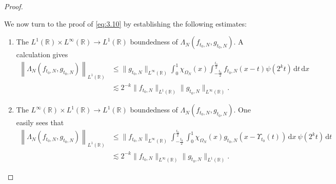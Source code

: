 \documentclass[11pt, twoside, leqno]{article}
\theoremstyle{definition}
\numberwithin{equation}{section}
\begin{document}
\begin{proof}
\begin{enumerate}
\quad We now turn to the proof of \eqref{eq:3.10} by establishing the following estimates:
\begin{enumerate}
  \item[$\circ$] The $L^1(\mathbb{R})\times L^\infty(\mathbb{R}) \rightarrow L^1(\mathbb{R})$ boundedness of $\Lambda_N(f_{t_0, N}, g_{t_0, N})$. A calculation gives
\begin{align*}
\left\|\Lambda_N(f_{t_0, N}, g_{t_0, N})\right\|_{L^{1}(\mathbb{R})}&\leq \|g_{t_0, N}\|_{L^{\infty}(\mathbb{R})}\int_{0}^{1}\chi_{\Omega_{N}}(x)\int_{-\frac{t_0}{2}}^{\frac{t_0}{2}}f_{t_0, N}(x-t)\psi\left(2^{k}t\right)\,\textrm{d}t\,\textrm{d}x\\ & \lesssim 2^{- k}\|f_{t_0, N}\|_{L^{1}(\mathbb{R})}\|g_{t_0, N}\|_{L^{\infty}(\mathbb{R})}.
\end{align*}

  \item[$\circ$] The $L^{\infty}(\mathbb{R})\times L^1(\mathbb{R}) \rightarrow L^1(\mathbb{R})$ boundedness of $\Lambda_N(f_{t_0, N}, g_{t_0, N})$. One easily sees that
  \begin{align*}
\left\|\Lambda_N(f_{t_0, N}, g_{t_0, N})\right\|_{L^{1}(\mathbb{R})}&\leq \|f_{t_0, N}\|_{L^{\infty}(\mathbb{R})}\int_{-\frac{t_0}{2}}^{\frac{t_0}{2}}\int_{0}^{1}\chi_{\Omega_{N}}(x)g_{t_0, N}\left(x-\Upsilon_{t_0}(t)\right)\,\textrm{d}x ~\psi\left(2^{k}t\right) \,\textrm{d}t\\ & \lesssim 2^{- k}\|f_{t_0, N}\|_{L^{\infty}(\mathbb{R})}\|g_{t_0, N}\|_{L^{1}(\mathbb{R})}.
\end{align*}


\end{enumerate}
\end{enumerate}
\end{proof}
\end{document}

